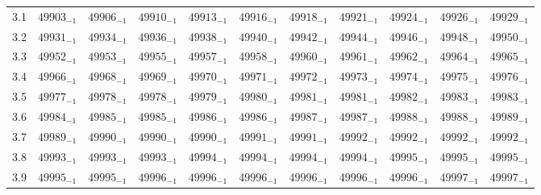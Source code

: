 \documentclass[10pt, a4paper]{article}
\begin{document}
\begin{center}
\begin{longtable}{c || c c c c c | c c c c c}
        3.1 & \({49903}_{-1}\) & \({49906}_{-1}\) & \({49910}_{-1}\) & \({49913}_{-1}\) & \({49916}_{-1}\) & \({49918}_{-1}\) & \({49921}_{-1}\) & \({49924}_{-1}\) & \({49926}_{-1}\) & \({49929}_{-1}\)\\
        3.2 & \({49931}_{-1}\) & \({49934}_{-1}\) & \({49936}_{-1}\) & \({49938}_{-1}\) & \({49940}_{-1}\) & \({49942}_{-1}\) & \({49944}_{-1}\) & \({49946}_{-1}\) & \({49948}_{-1}\) & \({49950}_{-1}\)\\
        3.3 & \({49952}_{-1}\) & \({49953}_{-1}\) & \({49955}_{-1}\) & \({49957}_{-1}\) & \({49958}_{-1}\) & \({49960}_{-1}\) & \({49961}_{-1}\) & \({49962}_{-1}\) & \({49964}_{-1}\) & \({49965}_{-1}\)\\
        3.4 & \({49966}_{-1}\) & \({49968}_{-1}\) & \({49969}_{-1}\) & \({49970}_{-1}\) & \({49971}_{-1}\) & \({49972}_{-1}\) & \({49973}_{-1}\) & \({49974}_{-1}\) & \({49975}_{-1}\) & \({49976}_{-1}\)\\
        3.5 & \({49977}_{-1}\) & \({49978}_{-1}\) & \({49978}_{-1}\) & \({49979}_{-1}\) & \({49980}_{-1}\) & \({49981}_{-1}\) & \({49981}_{-1}\) & \({49982}_{-1}\) & \({49983}_{-1}\) & \({49983}_{-1}\)\\
        3.6 & \({49984}_{-1}\) & \({49985}_{-1}\) & \({49985}_{-1}\) & \({49986}_{-1}\) & \({49986}_{-1}\) & \({49987}_{-1}\) & \({49987}_{-1}\) & \({49988}_{-1}\) & \({49988}_{-1}\) & \({49989}_{-1}\)\\
        3.7 & \({49989}_{-1}\) & \({49990}_{-1}\) & \({49990}_{-1}\) & \({49990}_{-1}\) & \({49991}_{-1}\) & \({49991}_{-1}\) & \({49992}_{-1}\) & \({49992}_{-1}\) & \({49992}_{-1}\) & \({49992}_{-1}\)\\
        3.8 & \({49993}_{-1}\) & \({49993}_{-1}\) & \({49993}_{-1}\) & \({49994}_{-1}\) & \({49994}_{-1}\) & \({49994}_{-1}\) & \({49994}_{-1}\) & \({49995}_{-1}\) & \({49995}_{-1}\) & \({49995}_{-1}\)\\
        3.9 & \({49995}_{-1}\) & \({49995}_{-1}\) & \({49996}_{-1}\) & \({49996}_{-1}\) & \({49996}_{-1}\) & \({49996}_{-1}\) & \({49996}_{-1}\) & \({49996}_{-1}\) & \({49997}_{-1}\) & \({49997}_{-1}\)\\
    \end{longtable}
    
\end{center}
\pagebreak
\end{document}
